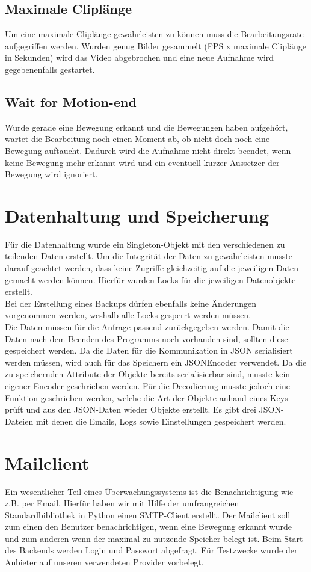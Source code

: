 \subsection{Maximale Cliplänge}
Um eine maximale Cliplänge gewährleisten zu können muss die Bearbeitungsrate aufgegriffen werden. Wurden genug Bilder gesammelt (FPS x maximale Cliplänge in Sekunden) wird das Video abgebrochen und eine neue Aufnahme wird gegebenenfalls gestartet.
\subsection{Wait for Motion-end}
Wurde gerade eine Bewegung erkannt und die Bewegungen haben aufgehört, wartet die Bearbeitung noch einen Moment ab, ob nicht doch noch eine Bewegung auftaucht. Dadurch wird die Aufnahme nicht direkt beendet, wenn keine Bewegung mehr erkannt wird und ein eventuell kurzer Aussetzer der Bewegung wird ignoriert.
\section{Datenhaltung und Speicherung}
Für die Datenhaltung wurde ein Singleton-Objekt mit den verschiedenen zu teilenden Daten erstellt. Um die Integrität der Daten zu gewährleisten musste darauf geachtet werden, dass keine Zugriffe gleichzeitig auf die jeweiligen Daten
gemacht werden können. Hierfür wurden Locks für die jeweiligen Datenobjekte erstellt.\\
Bei der Erstellung eines Backups dürfen ebenfalls keine Änderungen vorgenommen werden, weshalb alle Locks gesperrt werden müssen.\\
Die Daten müssen für die Anfrage passend zurückgegeben werden.
Damit die Daten nach dem Beenden des Programms noch vorhanden sind, sollten diese gespeichert werden. Da die Daten für die Kommunikation in JSON serialisiert werden müssen, wird auch für das Speichern ein JSONEncoder verwendet. Da die zu speichernden Attribute
der Objekte bereits serialisierbar sind, musste kein eigener Encoder geschrieben werden. Für die Decodierung musste jedoch eine Funktion geschrieben werden, welche die Art der Objekte anhand eines Keys prüft und aus den JSON-Daten wieder Objekte erstellt.
Es gibt drei JSON-Dateien mit denen die Emails, Logs sowie Einstellungen gespeichert werden.
\section{Mailclient}
Ein wesentlicher Teil eines Überwachungssystems ist die Benachrichtigung wie z.B. per Email.
Hierfür haben wir mit Hilfe der umfrangreichen Standardbibliothek in Python einen SMTP-Client erstellt.
Der Mailclient soll zum einen den Benutzer benachrichtigen, wenn eine Bewegung erkannt wurde und zum anderen wenn der maximal zu nutzende Speicher belegt ist.
Beim Start des Backends werden Login und Passwort abgefragt. Für Testzwecke wurde der Anbieter auf unseren verwendeten Provider vorbelegt.
